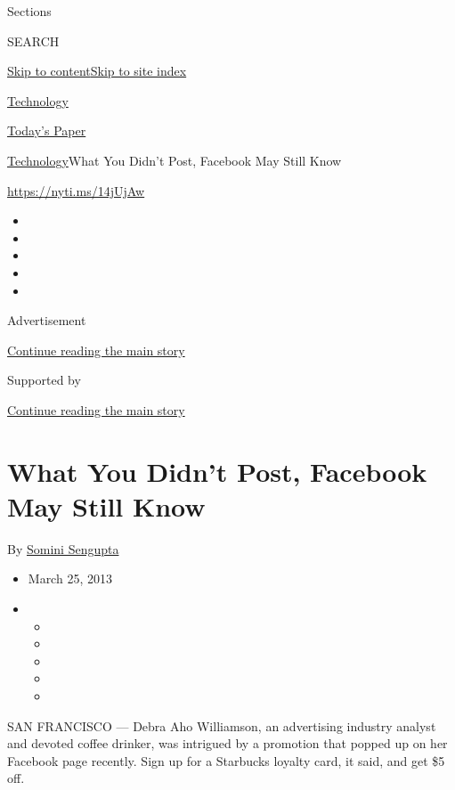 Sections

SEARCH

\protect\hyperlink{site-content}{Skip to
content}\protect\hyperlink{site-index}{Skip to site index}

\href{https://www.nytimes.com/section/technology}{Technology}

\href{https://myaccount.nytimes.com/auth/login?response_type=cookie\&client_id=vi}{}

\href{https://www.nytimes.com/section/todayspaper}{Today's Paper}

\href{/section/technology}{Technology}\textbar{}What You Didn't Post,
Facebook May Still Know

\url{https://nyti.ms/14jUjAw}

\begin{itemize}
\item
\item
\item
\item
\item
\end{itemize}

Advertisement

\protect\hyperlink{after-top}{Continue reading the main story}

Supported by

\protect\hyperlink{after-sponsor}{Continue reading the main story}

\hypertarget{what-you-didnt-post-facebook-may-still-know}{%
\section{What You Didn't Post, Facebook May Still
Know}\label{what-you-didnt-post-facebook-may-still-know}}

By \href{https://www.nytimes.com/by/somini-sengupta}{Somini Sengupta}

\begin{itemize}
\item
  March 25, 2013
\item
  \begin{itemize}
  \item
  \item
  \item
  \item
  \item
  \end{itemize}
\end{itemize}

SAN FRANCISCO --- Debra Aho Williamson, an advertising industry analyst
and devoted coffee drinker, was intrigued by a promotion that popped up
on her Facebook page recently. Sign up for a Starbucks loyalty card, it
said, and get \$5 off.

